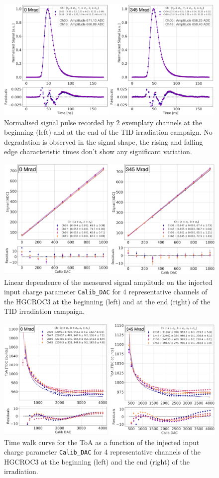\begin{figure}
    \centering
    \includegraphics[width=0.7\linewidth]{Figures/HGCAL/TID_SignalShape.pdf}
    \caption{Normalised signal pulse recorded by 2 exemplary channels at the beginning (left) and at the end of the TID irradiation campaign. No degradation is observed in the signal shape, the rising and falling edge characteristic times don't show any significant variation.}
    \label{fig:TID_SignalShape}
\end{figure}

\begin{figure}
    \centering
    \includegraphics[width=0.7\linewidth]{Figures/HGCAL/TID_ADCLinearity.pdf}
    \caption{Linear dependence of the measured signal amplitude on the injected input charge parameter \texttt{Calib\_DAC} for 4 representative channels of the HGCROC3 at the beginning (left) and at the end (right) of the TID irradiation campaign.}
    \label{fig:TID_ADCLinearity}
\end{figure}

\begin{figure}
    \centering
    \includegraphics[width=0.7\linewidth]{Figures/HGCAL/TID_TimeWalk.pdf}
    \caption{Time walk curve for the ToA as a function of the injected input charge parameter \texttt{Calib\_DAC} for 4 representative channels of the HGCROC3 at the beginning (left) and the end (right) of the irradiation.}
    \label{fig:TID_TimeWalk}
\end{figure}

